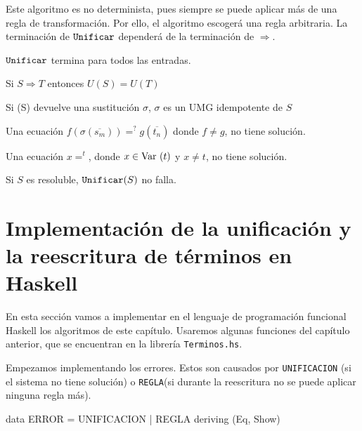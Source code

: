 Este algoritmo es no determinista, pues siempre se puede aplicar más
de una regla de transformación. Por ello, el algoritmo escogerá una
regla arbitraria. La terminación de $\mbox{\texttt{Unificar}}$ dependerá de la
terminación de $\Longrightarrow$.

\begin{lema} 
  $\mbox{\texttt{Unificar}}$ termina para todos las entradas.
\end{lema}

\begin{lema}
  Si $S \Longrightarrow T$ entonces $U(S) = U(T)$
\end{lema}

\begin{lema} 
  Si \Unify(S) devuelve una sustitución $\sigma$, $\sigma$ es un UMG
  idempotente de $S$
\end{lema}


\begin{lema}
  Una ecuación $f(\sigma(\overline{s_m})) =^?  g(\overline{t_n})$
  donde $f \not = g$, no tiene solución.
\end{lema}

\begin{lema}
  Una ecuación $x =^ t$, donde $x \in \mbox{Var }(t)$ y $x \not = t$, no
  tiene solución.
\end{lema}

\begin{lema} 
  Si $S$ es resoluble, $\mbox{\texttt{Unificar}}(S)$ no falla.
\end{lema}

\section{Implementación de la unificación y la reescritura de términos
  en Haskell}

En esta sección vamos a implementar en el lenguaje de programación
funcional Haskell los algoritmos de este capítulo. Usaremos algunas
funciones del capítulo anterior, que se encuentran en la librería
\texttt{Terminos.hs}.

Empezamos implementando los errores. Estos son causados por
\texttt{UNIFICACION} (si el sistema no tiene solución) o
\texttt{REGLA}(si durante la reescritura no se
puede aplicar ninguna regla más).
\begin{codigo}
data ERROR = UNIFICACION
           | REGLA
           deriving (Eq, Show)
\end{codigo}


